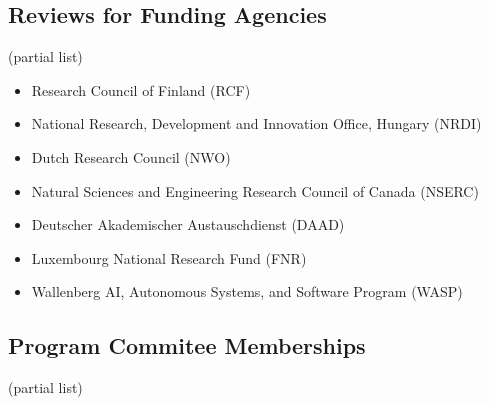 \documentclass[paper=letter,fontsize=11pt]{scrartcl} %
\begin{document}
\subsection*{Reviews for Funding Agencies}

(partial list)

\begin{itemize}
  \item Research Council of Finland (RCF)
  \item National Research, Development and Innovation Office, Hungary (NRDI)
  \item Dutch Research Council (NWO)
  \item Natural Sciences and Engineering Research Council of Canada (NSERC)
	\item Deutscher Akademischer Austauschdienst (DAAD)
	\item Luxembourg National Research Fund (FNR)
  \item Wallenberg AI, Autonomous Systems, and Software Program  (WASP)
\end{itemize}

\subsection*{Program Commitee Memberships}

(partial list)
\end{document}

